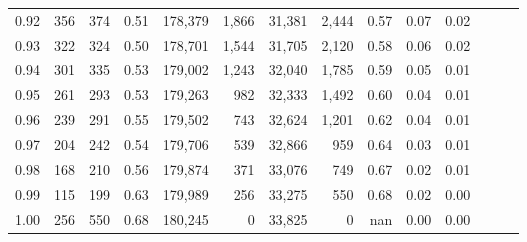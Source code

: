 \begin{tabular}{rrrrrrrrrrrrrr}
0.92 &    356 &  374 &  0.51 &  178,379 &    1,866 &  31,381 &   2,444 &  0.57 &  0.07 &      0.02 \\
0.93 &    322 &  324 &  0.50 &  178,701 &    1,544 &  31,705 &   2,120 &  0.58 &  0.06 &      0.02 \\
0.94 &    301 &  335 &  0.53 &  179,002 &    1,243 &  32,040 &   1,785 &  0.59 &  0.05 &      0.01 \\
0.95 &    261 &  293 &  0.53 &  179,263 &      982 &  32,333 &   1,492 &  0.60 &  0.04 &      0.01 \\
0.96 &    239 &  291 &  0.55 &  179,502 &      743 &  32,624 &   1,201 &  0.62 &  0.04 &      0.01 \\
0.97 &    204 &  242 &  0.54 &  179,706 &      539 &  32,866 &     959 &  0.64 &  0.03 &      0.01 \\
0.98 &    168 &  210 &  0.56 &  179,874 &      371 &  33,076 &     749 &  0.67 &  0.02 &      0.01 \\
0.99 &    115 &  199 &  0.63 &  179,989 &      256 &  33,275 &     550 &  0.68 &  0.02 &      0.00 \\
1.00 &    256 &  550 &  0.68 &  180,245 &        0 &  33,825 &       0 &   nan &  0.00 &      0.00 \\
\bottomrule
\end{tabular}
